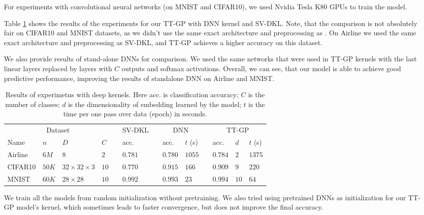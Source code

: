   For experiments with convolutional neural networks (on MNIST and CIFAR10), we 
  used Nvidia Tesla K80 GPUs to train the model.

  Table \ref{deep_results} shows the results of the experiments for our TT-GP
  with DNN kernel and SV-DKL. Note, that the comparison
  is not absolutely fair on CIFAR10 and MNIST datasets, as we didn't use
  the same exact architecture and preprocessing as \citet{wilson2016stochastic}.
  On Airline we used the same exact architecture and preprocessing as 
  SV-DKL, and TT-GP achieves a higher accuracy on this dataset.

  We also provide results of stand-alone DNNs for comparison. We used the 
  same networks that were used in TT-GP kernels with the last linear layers replaced
  by layers with $C$ outputs and softmax activations. Overall, we can see, that 
  our model is able to achieve good predictive performance,
  improving the results of standalone DNN on Airline and MNIST.
  
  \begin{table}[h]
    \caption{Results of experimetns with deep kernels. Here acc. is classification
            accuracy; $C$ is the number of classes; $d$ is the dimensionality
            of embedding learned by the model; $t$ is the time per one pass over
            data (epoch) in seconds.}
    \label{deep_results}
    \centering
    \begin{tabular}{llll ll llll lll}
      \toprule
      \multicolumn{4}{c}{Dataset}  && SV-DKL && 
      \multicolumn{2}{c}{DNN} &&
      \multicolumn{3}{c}{TT-GP}\\
      
      \cmidrule{1-4}
      \cmidrule{6-6}
      \cmidrule{8-9}
      \cmidrule{11-13}
      
      Name & $n$ & $D$ & $C$ &&
      acc. && acc. & $t$ (s) &&
      acc. & $d$ & $t$ (s)
      \\
      \midrule


      
      Airline & $6M$ & $8$ & $2$ && 
      $0.781$ && $0.780$ & $1055$ &&  
      $0.784$ & $2$ & $1375$\\
      
      CIFAR10 & $50K$ & $32{\times}32{\times}3$ & $10$ && 
      $0.770$ && $0.915$ & $166$ && 
      $0.909$ & $9$ & $220$\\
      
      MNIST & $60K$ & $28{\times}28$ & $10$ && 
      $0.992$ && $0.993$ & $23$ && 
      $0.994$ & $10$ & $64$\\
      \bottomrule
    \end{tabular}
  \end{table}

  We train all the models from random initialization without pretraining. We also
  tried using pretrained DNNs as initialization for our TT-GP model's kernel,
  which sometimes leads to faster convergence, but does not improve the final
  accuracy.
